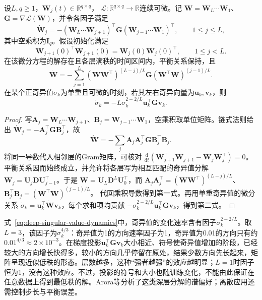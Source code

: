\begin{theorem}[平衡深层线性神经网络的梯度流]
\label{thm:balanced-deep-linear-flow}
设$L,q\geq1$，$\bm W_j(t)\in\mathbb R^{q\times q}$，
$\mathcal L:\mathbb R^{q\times q}\to\mathbb R$连续可微。记
$\bm W=\bm W_L\cdots\bm W_1$、$\bm G=\nabla\mathcal L(\bm W)$，并令各因子满足
\[
 \dot{\bm W}_j
 =-(\bm W_L\cdots\bm W_{j+1})^\top
   \bm G
   (\bm W_{j-1}\cdots\bm W_1)^\top,\qquad 1\leq j\leq L,
\]
其中空乘积为$\bm I_q$。假设初始化满足
\[
 \bm W_{j+1}(0)^\top\bm W_{j+1}(0)
 =\bm W_j(0)\bm W_j(0)^\top,\qquad 1\leq j<L.
\]
在该微分方程的解存在且各层满秩的时间区间内，平衡关系保持，且
\begin{equation}
 \dot{\bm W}
 =-\sum_{j=1}^{L}
   (\bm W\bm W^\top)^{(L-j)/L}\bm G
   (\bm W^\top\bm W)^{(j-1)/L}.
 \label{eq:balanced-matrix-gradient-flow}
\end{equation}
在某个正奇异值$\sigma_k$为单重且可微的时刻，若其左右奇异向量为$\bm u_k,\bm v_k$，则
\begin{equation}
 \dot\sigma_k=-L\sigma_k^{2-2/L}\bm u_k^\top\bm G\bm v_k.
 \label{eq:deep-singular-value-dynamics}
\end{equation}
\end{theorem}
\begin{proof}
写$\bm A_j=\bm W_L\cdots\bm W_{j+1}$、$\bm B_j=\bm W_{j-1}\cdots\bm W_1$，空乘积取单位矩阵。链式法则给出
$\dot{\bm W}_j=-\bm A_j^\top\bm G\bm B_j^\top$，故
\[
 \dot{\bm W}=-\sum_j\bm A_j\bm A_j^\top\bm G\bm B_j^\top\bm B_j.
\]
将同一导数代入相邻层的Gram矩阵，可核对
$\frac{\mathrm d}{\mathrm dt}(\bm W_{j+1}^\top\bm W_{j+1}-\bm W_j\bm W_j^\top)=0$。
平衡关系因而始终成立，并允许将各层写为相互匹配的奇异值分解
$\bm W_j=\bm U_j\bm D\bm U_{j-1}^\top$。于是
$\bm W=\bm U_L\bm D^L\bm U_0^\top$，而
$\bm A_j\bm A_j^\top=(\bm W\bm W^\top)^{(L-j)/L}$、
$\bm B_j^\top\bm B_j=(\bm W^\top\bm W)^{(j-1)/L}$。
代回乘积导数得到第一式。再用单重奇异值的微分关系
$\dot\sigma_k=\bm u_k^\top\dot{\bm W}\bm v_k$，每个求和项均贡献
$-\sigma_k^{2-2/L}\bm u_k^\top\bm G\bm v_k$，得到第二式。
\end{proof}

式~\eqref{eq:deep-singular-value-dynamics}中，奇异值的变化速率含有因子$\sigma_k^{2-2/L}$。取$L=3$，该因子为$\sigma_k^{4/3}$：奇异值为1的方向速率因子为1，奇异值为0.01的方向只有约$0.01^{4/3}\approx2\times10^{-3}$。在梯度投影$\bm u_k^\top\bm G\bm v_k$大小相近、符号使奇异值增加的阶段，已经较大的方向增长快得多，较小的方向几乎停留在原处，结果少数方向先长起来，矩阵呈现近似低秩的形态。层数越多，这种“强者越强”的效应越明显；$L=1$时因子恒为1，没有这种效应。不过，投影的符号和大小也随训练变化，不能由此保证在任意数据上得到最低秩的解。Arora等分析了这类深层分解的谱偏好；离散应用还需控制步长与平衡误差。


